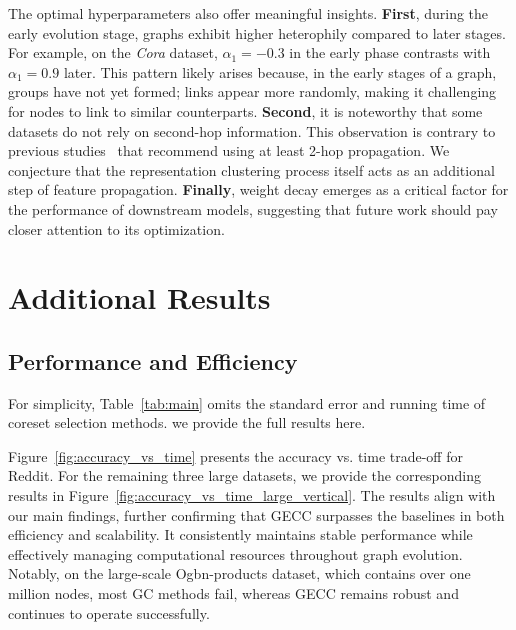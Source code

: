 The optimal hyperparameters also offer meaningful insights. \textbf{First}, during the early evolution stage, graphs exhibit higher heterophily compared to later stages. For example, on the \textit{Cora} dataset, $\alpha_1=-0.3$ in the early phase contrasts with $\alpha_1=0.9$ later. This pattern likely arises because, in the early stages of a graph, groups have not yet formed; links appear more randomly, making it challenging for nodes to link to similar counterparts.
\textbf{Second}, it is noteworthy that some datasets do not rely on second-hop information. This observation is contrary to previous studies~\cite{wu2019simplifying,luo_classic_2024} that recommend using at least 2-hop propagation. We conjecture that the representation clustering process itself acts as an additional step of feature propagation.
\textbf{Finally}, weight decay emerges as a critical factor for the performance of downstream models, suggesting that future work should pay closer attention to its optimization.




\section{Additional Results}
\subsection{Performance and Efficiency}
For simplicity, Table~\ref{tab:main} omits the standard error and running time of coreset selection methods. we provide the full results here.

Figure~\ref{fig:accuracy_vs_time} presents the accuracy vs. time trade-off for Reddit. For the remaining three large datasets, we provide the corresponding results in Figure~\ref{fig:accuracy_vs_time_large_vertical}. 
The results align with our main findings, further confirming that GECC surpasses the baselines in both efficiency and scalability. It consistently maintains stable performance while effectively managing computational resources throughout graph evolution. Notably, on the large-scale Ogbn-products dataset, which contains over one million nodes, most GC methods fail, whereas GECC remains robust and continues to operate successfully.


